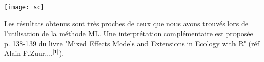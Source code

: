 \documentclass[11pt,fleqn]{book} %
\begin{document}
\vspace{2em}


\vspace{4em}

\texttt{[image: sc]}

\vspace{2em}

Les résultats obtenus sont très proches de ceux que nous avons trouvés lors de l'utilisation de la méthode ML. Une interprétation complémentaire est proposée p. 138-139 du livre "Mixed Effects Models and Extensions in Ecology with R" (réf Alain F.Zuur,...$^{\textbf{[1]}}$).



\end{document}
